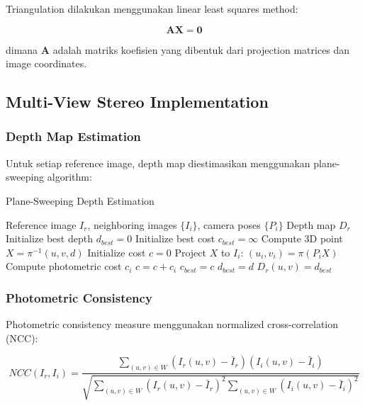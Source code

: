 \documentclass[12pt,a4paper]{article}
\begin{document}
Triangulation dilakukan menggunakan linear least squares method:

\begin{equation}
\mathbf{A} \mathbf{X} = \mathbf{0}
\end{equation}

dimana $\mathbf{A}$ adalah matriks koefisien yang dibentuk dari projection matrices dan image coordinates.

\subsection{Multi-View Stereo Implementation}

\subsubsection{Depth Map Estimation}

Untuk setiap reference image, depth map diestimasikan menggunakan plane-sweeping algorithm:

\begin{algorithm}[H]
\caption{Plane-Sweeping Depth Estimation}
\begin{algorithmic}[1]
\REQUIRE Reference image $I_r$, neighboring images $\{I_i\}$, camera poses $\{P_i\}$
\ENSURE Depth map $D_r$
    \STATE Initialize best depth $d_{best} = 0$
    \STATE Initialize best cost $c_{best} = \infty$
        \STATE Compute 3D point $X = \pi^{-1}(u,v,d)$
        \STATE Initialize cost $c = 0$
            \STATE Project $X$ to $I_i$: $(u_i, v_i) = \pi(P_i X)$
            \STATE Compute photometric cost $c_i$
            \STATE $c = c + c_i$
        \ENDFOR
            \STATE $c_{best} = c$
            \STATE $d_{best} = d$
        \ENDIF
    \ENDFOR
    \STATE $D_r(u,v) = d_{best}$
\ENDFOR
\end{algorithmic}
\end{algorithm}

\subsubsection{Photometric Consistency}

Photometric consistency measure menggunakan normalized cross-correlation (NCC):

\begin{equation}
NCC(I_r, I_i) = \frac{\sum_{(u,v) \in W} (I_r(u,v) - \bar{I}_r)(I_i(u,v) - \bar{I}_i)}{\sqrt{\sum_{(u,v) \in W} (I_r(u,v) - \bar{I}_r)^2 \sum_{(u,v) \in W} (I_i(u,v) - \bar{I}_i)^2}}
\end{equation}
\end{document}
